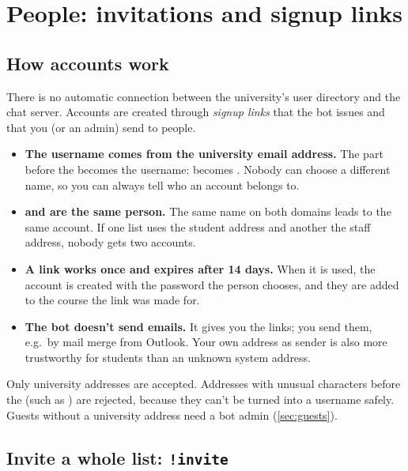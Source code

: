 \chapter{People: invitations and signup links}
\label{ch:people}

\section{How accounts work}

There is no automatic connection between the university's user directory and the chat
server. Accounts are created through \emph{signup links} that the bot issues and that you (or
an admin) send to people.

\begin{itemize}
  \item \textbf{The username comes from the university email address.} The part before the
         becomes the username:  becomes
        . Nobody can choose a different name, so you
        can always tell who an account belongs to.
  \item \textbf{ and  are the same person.} The same name
        on both domains leads to the same account. If one list uses the student address and
        another the staff address, nobody gets two accounts.
  \item \textbf{A link works once and expires after 14 days.} When it is used, the account is
        created with the password the person chooses, and they are added to the course the
        link was made for.
  \item \textbf{The bot doesn't send emails.} It gives you the links; you send them, e.g.\ by
        mail merge from Outlook. Your own address as sender is also more trustworthy for
        students than an unknown system address.
\end{itemize}

Only university addresses are accepted. Addresses with unusual characters before the
 (such as \cmd{+}) are rejected, because they can't be turned into a username safely.
Guests without a university address need a bot admin (\autoref{sec:guests}).

\section{Invite a whole list: \texttt{!invite}}

